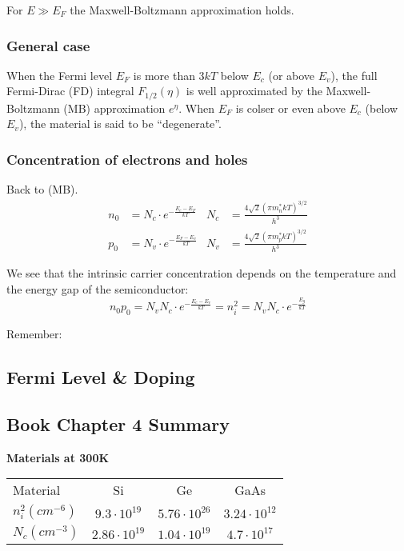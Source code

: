 \documentclass[a4paper, fontsize=8pt, landscape, DIV=1]{scrartcl}
\begin{document}
\begin{multicols*}{4}
  For $E \gg E_F$ the Maxwell-Boltzmann approximation holds.

  \subsubsection{General case}
  When the Fermi level $E_F$ is more than $3kT$ below $E_c$ (or above $E_v$), the full Fermi-Dirac (FD) integral $F_{1/2}(\eta)$ is well approximated by the Maxwell-Boltzmann (MB) approximation $e^\eta$.
  When $E_F$ is colser or even above $E_c$ (below $E_v$), the material is said to be ``degenerate''.

  \subsubsection{Concentration of electrons and holes}
  Back to (MB).
  \begin{align*}
    n_0 &= N_c \cdot e^{-\frac{E_c-E_F}{kT}} & N_c &= \frac{4\sqrt{2}(\pi m^*_n kT)^{3/2}}{h^3} \\
    p_0 &= N_v \cdot e^{-\frac{E_F-E_v}{kT}} & N_v &= \frac{4\sqrt{2}(\pi m^*_p kT)^{3/2}}{h^3} 
  \end{align*}

  We see that the intrinsic carrier concentration depends on the temperature and the energy gap of the semiconductor:
  \[n_0 p_0 = N_v N_c \cdot e^{-\frac{E_c-E_v}{kT}} = n_i^2 = N_vN_c\cdot e^{-\frac{E_g}{kT}}\]

  Remember:

  \subsection{Fermi Level \& Doping}
  
  \subsection{Book Chapter 4 Summary}

    \textbf{Materials at 300K} \\
      \begin{tabular}[h]{l c c c}
        Material & Si & Ge & GaAs \\
        $n_i^2(cm^{-6})$  & $9.3\cdot 10^{19}$  & $5.76\cdot 10^{26}$ & $3.24\cdot 10^{12}$ \\
        $N_c(cm^{-3})$    & $2.86\cdot 10^{19}$ & $1.04\cdot 10^{19}$ & $4.7\cdot 10^{17}$ \\


\end{tabular}
\end{multicols*}
\end{document}
